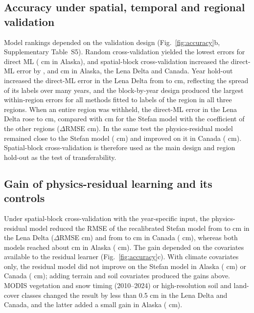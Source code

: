 \subsection{Accuracy under spatial, temporal and regional validation}
Model rankings depended on the validation design (Fig.~\ref{fig:accuracy}b, Supplementary Table~S5). Random cross-validation yielded the lowest errors for direct ML (\nrmseAkrandDz{} cm in Alaska), and spatial-block cross-validation increased the direct-ML error by \noptimAkDz, \noptimLeDz{} and \noptimCaDz{} cm in Alaska, the Lena Delta and Canada. Year hold-out increased the direct-ML error in the Lena Delta from \nrmseLeblkDz{} to \nrmseLeyrDz{} cm, reflecting the spread of its labels over many years, and the block-by-year design produced the largest within-region errors for all methods fitted to labels of the region in all three regions. When an entire region was withheld, the direct-ML error in the Lena Delta rose to \nrmseLeregDz{} cm, compared with \nrmseLeregPz{} cm for the Stefan model with the coefficient of the other regions ($\Delta$RMSE \ndrefLeregDz{} cm). In the same test the physics-residual model remained close to the Stefan model (\ndrefLeregRo{} cm) and improved on it in Canada (\ndrefCaregRo{} cm). Spatial-block cross-validation is therefore used as the main design and region hold-out as the test of transferability.

\subsection{Gain of physics-residual learning and its controls}
Under spatial-block cross-validation with the year-specific input, the physics-residual model reduced the RMSE of the recalibrated Stefan model from \nrmseLeblkPo{} to \nrmseLeblkRo{} cm in the Lena Delta ($\Delta$RMSE \ndrefLeblkRo{} cm) and from \nrmseCablkPo{} to \nrmseCablkRo{} cm in Canada (\ndrefCablkRo{} cm), whereas both models reached about \nrmseAkblkRo{} cm in Alaska (\ndrefAkblkRo{} cm). The gain depended on the covariates available to the residual learner (Fig.~\ref{fig:accuracy}c). With climate covariates only, the residual model did not improve on the Stefan model in Alaska (\ndfeatAkFclim{} cm) or Canada (\ndfeatCaFclim{} cm); adding terrain and soil covariates produced the gains above. MODIS vegetation and snow timing (2010--2024) or high-resolution soil and land-cover classes changed the result by less than 0.5 cm in the Lena Delta and Canada, and the latter added a small gain in Alaska (\ndfeatAkFhires{} cm).

